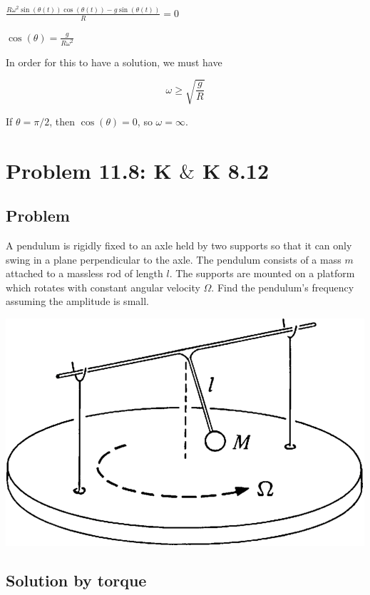 \documentclass{article}
\begin{document}
\begin{doublespace}
\noindent\(\frac{R \omega ^2 \sin (\theta (t)) \cos (\theta (t))-g \sin (\theta (t))}{R}=0\)
\end{doublespace}

\begin{doublespace}
\noindent\(\cos (\theta )=\frac{g}{R \omega ^2}\)
\end{doublespace}

In order for this to have a solution, we must have 

\[\omega \geq \sqrt{\frac{g}{R}}\]

If \(\theta =\pi /2\), then \(\cos (\theta )=0\), so \(\omega =\infty\).

\section*{Problem 11.8: K $\&$ K 8.12}

\subsection*{Problem}

A pendulum is rigidly fixed to an axle held by two supports so that it can only swing in a plane perpendicular to the axle. The pendulum consists
of a mass \(m\) attached to a massless rod of length \(l\). The supports are mounted on a platform which rotates with constant angular velocity \(\Omega\).
Find the pendulum{'}s frequency assuming the amplitude is small.

\includegraphics{Principle of Least Action_gr2.eps}

\subsection*{Solution by torque}
\end{document}

